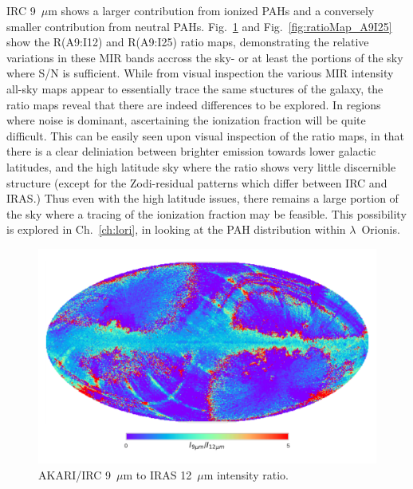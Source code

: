        IRC 9~$\mu$m shows a larger contribution from ionized PAHs and a conversely smaller contribution from neutral PAHs. Fig.~\ref{fig:ratioMap_A9I12} and Fig.~\ref{fig:ratioMap_A9I25} show the R(A9:I12) and R(A9:I25) ratio maps, demonstrating the relative variations in these MIR bands accross the sky- or at least the portions of the sky where S/N is sufficient. While from visual inspection the various MIR intensity all-sky maps appear to essentially trace the same stuctures of the galaxy, the ratio maps reveal that there are indeed differences to be explored.  In regions where noise is dominant, ascertaining the ionization fraction will be quite difficult. This can be easily seen upon visual inspection of the ratio maps, in that there is a clear deliniation between brighter emission towards lower galactic latitudes, and the high latitude sky where the ratio shows very little discernible structure (except for the Zodi-residual patterns which differ between IRC and IRAS.) Thus even with the high latitude issues, there remains a large portion of the sky where a tracing of the ionization fraction may be feasible. This possibility is explored in Ch.~\ref{ch:lori}, in looking at the PAH distribution within $\lambda$~Orionis.
       \begin{figure}
         \centering
         \includegraphics[width=\textwidth]{../Plots/ch_datasources/ratioMap_A9I12.pdf}
         \caption{ AKARI/IRC 9~$\mu$m to IRAS 12~$\mu$m intensity ratio.}
         \label{fig:ratioMap_A9I12}
       \end{figure}
